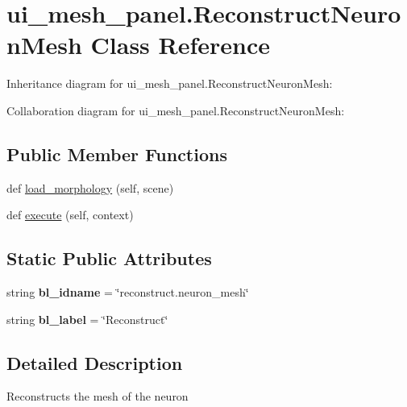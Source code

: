 \hypertarget{classui__mesh__panel_1_1ReconstructNeuronMesh}{}\section{ui\+\_\+mesh\+\_\+panel.\+Reconstruct\+Neuron\+Mesh Class Reference}
\label{classui__mesh__panel_1_1ReconstructNeuronMesh}


Inheritance diagram for ui\+\_\+mesh\+\_\+panel.\+Reconstruct\+Neuron\+Mesh\+:


Collaboration diagram for ui\+\_\+mesh\+\_\+panel.\+Reconstruct\+Neuron\+Mesh\+:
\subsection*{Public Member Functions}
\begin{DoxyCompactItemize}
\item 
def \hyperlink{classui__mesh__panel_1_1ReconstructNeuronMesh_a4af9604b1673aebf4956e184c940f4da}{load\+\_\+morphology} (self, scene)
\item 
def \hyperlink{classui__mesh__panel_1_1ReconstructNeuronMesh_a7cecac1bc8196d8ad62dc6aecf8abcef}{execute} (self, context)
\end{DoxyCompactItemize}
\subsection*{Static Public Attributes}
\begin{DoxyCompactItemize}
\item 
string {\bfseries bl\+\_\+idname} = \char`\"{}reconstruct.\+neuron\+\_\+mesh\char`\"{}\hypertarget{classui__mesh__panel_1_1ReconstructNeuronMesh_aafb08daa12ba9ca446b864f3cff1a18e}{}\label{classui__mesh__panel_1_1ReconstructNeuronMesh_aafb08daa12ba9ca446b864f3cff1a18e}

\item 
string {\bfseries bl\+\_\+label} = \char`\"{}Reconstruct\char`\"{}\hypertarget{classui__mesh__panel_1_1ReconstructNeuronMesh_a2caf1d922d792a654d64066abe354340}{}\label{classui__mesh__panel_1_1ReconstructNeuronMesh_a2caf1d922d792a654d64066abe354340}

\end{DoxyCompactItemize}


\subsection{Detailed Description}
\begin{DoxyVerb}Reconstructs the mesh of the neuron\end{DoxyVerb}
 

